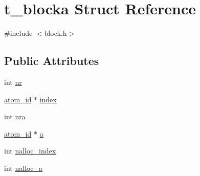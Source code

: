 \hypertarget{structt__blocka}{\section{t\-\_\-blocka \-Struct \-Reference}
\label{structt__blocka}
}


{\ttfamily \#include $<$block.\-h$>$}

\subsection*{\-Public \-Attributes}
\begin{DoxyCompactItemize}
\item 
int \hyperlink{structt__blocka_a8e908831b35eb89913fb4bab91192b7a}{nr}
\item 
\hyperlink{include_2types_2simple_8h_ad3f47cdb48677e516e2049719612c737}{atom\-\_\-id} $\ast$ \hyperlink{structt__blocka_ac7dc8132d0ccd9b599a26160b5a15a2e}{index}
\item 
int \hyperlink{structt__blocka_ae02c2b24080a9ba80fc71202c236c88b}{nra}
\item 
\hyperlink{include_2types_2simple_8h_ad3f47cdb48677e516e2049719612c737}{atom\-\_\-id} $\ast$ \hyperlink{structt__blocka_a16498d1da158bcdc790dea70dce35d92}{a}
\item 
int \hyperlink{structt__blocka_a897adece5ffeebfb2ce39a18f4fe374e}{nalloc\-\_\-index}
\item 
int \hyperlink{structt__blocka_acf9ea36552f1a02b2a54246de5314829}{nalloc\-\_\-a}
\end{DoxyCompactItemize}


